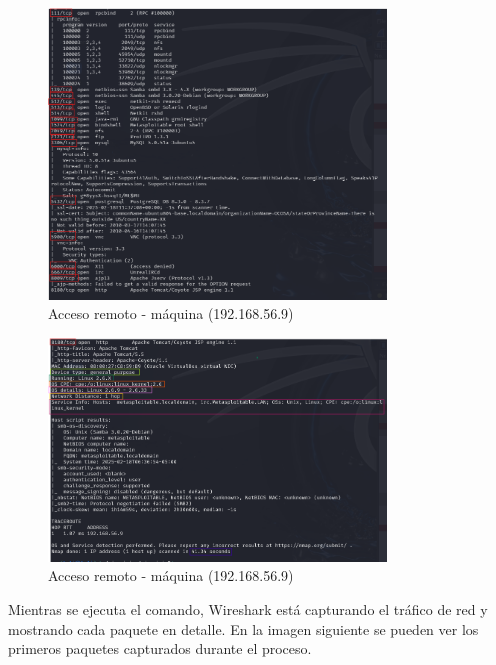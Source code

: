 \documentclass[a4paper,12pt]{article} %
\begin{document}
\newpage

        \begin{figure} [hp!]
         \centering
         \includegraphics[width=0.8\textwidth]{Imagenes/puertos91 - copia.png}
         \caption{Acceso remoto - máquina (192.168.56.9) }
         \label{fig:wireshark2}
        \end{figure}

        \begin{figure} [hp!]
         \centering
         \includegraphics[width=0.8\textwidth]{Imagenes/info2.png}
         \caption{Acceso remoto - máquina (192.168.56.9) }
         \label{fig:wireshark2}
        \end{figure}

\newpage
    Mientras se ejecuta el comando, Wireshark está capturando el tráfico de red y mostrando cada paquete en detalle. En la imagen siguiente se pueden ver los primeros paquetes capturados durante el proceso.
 
\end{document}
